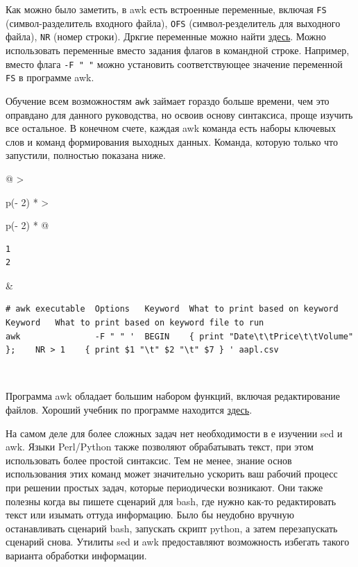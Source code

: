 \documentclass{report}
\begin{document}
Как можно было заметить, в awk есть встроенные переменные, включая
\texttt{FS} (символ-разделитель входного файла), \texttt{OFS}
(символ-резделитель для выходного файла), \texttt{NR} (номер строки).
Дркгие переменные можно найти
\href{https://www.tutorialspoint.com/awk/awk_built_in_variables.htm}{здесь}.
Можно использовать переменные вместо задания флагов в командной строке.
Например, вместо флага \texttt{-F\ "\ "} можно установить
соответствующее значение переменной \texttt{FS} в программе awk.

Обучение всем возможностям \texttt{awk} займает гораздо больше времени,
чем это оправдано для данного руководства, но освоив основу синтаксиса,
проще изучить все остальное. В конечном счете, каждая awk команда есть
наборы ключевых слов и команд формирования выходных данных. Команда,
которую только что запустили, полностью показана ниже.

\begin{longtable}[]{@{}
  >{\raggedright\arraybackslash}p{(\columnwidth - 2\tabcolsep) * }
  >{\raggedright\arraybackslash}p{(\columnwidth - 2\tabcolsep) * }@{}}
\toprule
\endhead
\begin{minipage}[t]{\linewidth}\raggedright
\begin{verbatim}
1
2
\end{verbatim}
\end{minipage} & \begin{minipage}[t]{\linewidth}\raggedright
\begin{verbatim}
# awk executable  Options   Keyword  What to print based on keyword          Keyword   What to print based on keyword file to run
awk               -F " " '  BEGIN    { print "Date\t\tPrice\t\tVolume" };    NR > 1    { print $1 "\t" $2 "\t" $7 } ' aapl.csv
\end{verbatim}
\end{minipage} \\ \addlinespace
\bottomrule
\end{longtable}

Программа awk обладает большим набором функций, включая редактирование
файлов. Хороший учебник по программе находится
\href{https://likegeeks.com/awk-command/}{здесь}.

На самом деле для более сложных задач нет необходимости в е изучении sed
и awk. Языки Perl/Python также позволяют обрабатывать текст, при этом
использовать более простой синтаксис. Тем не менее, знание основ
использования этих команд может значительно ускорить ваш рабочий процесс
при решении простых задач, которые периодически возникают. Они также
полезны когда вы пишете сценарий для bash, где нужно как-то
редактировать текст или изымать оттуда информацию. Было бы неудобно
вручную останавливать сценарий bash, запускать скрипт python, а затем
перезапускать сценарий снова. Утилиты sed и awk предоставляют
возможность избегать такого варианта обработки информации.
\end{document}
